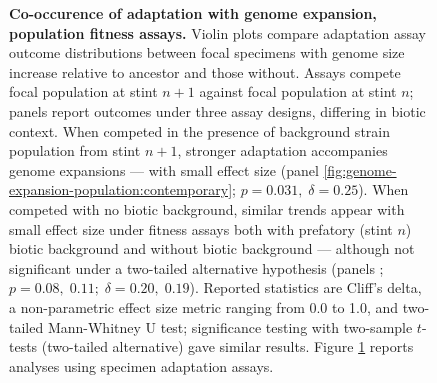 \begin{figure}
\caption{
    \textbf{Co-occurence of adaptation with genome expansion, population fitness assays.}
    \footnotesize
    Violin plots compare adaptation assay outcome distributions between focal specimens with genome size increase relative to ancestor and those without.
    Assays compete focal population at stint $n+1$ against focal population at stint $n$;
    panels report outcomes under three assay designs, differing in biotic context.
    When competed in the presence of background strain population from stint $n+1$, stronger adaptation accompanies genome expansions --- with small effect size (panel \ref{fig:genome-expansion-population:contemporary}; $p = 0.031, \; \delta = 0.25$).
    When competed with no biotic background, similar trends appear with small effect size under fitness assays both with prefatory (stint $n$) biotic background and without biotic background --- although not significant under a two-tailed alternative hypothesis (panels ; $p=0.08,\; 0.11; \; \delta = 0.20, \; 0.19$).
    Reported statistics are Cliff's delta, a non-parametric effect size metric ranging from 0.0 to 1.0, and two-tailed Mann-Whitney U test; significance testing with two-sample $t$-tests (two-tailed alternative) gave similar results.
    Figure \ref{fig:genome-expansion-population} reports analyses using specimen adaptation assays.
}
\label{fig:genome-expansion-population}

\end{figure}
